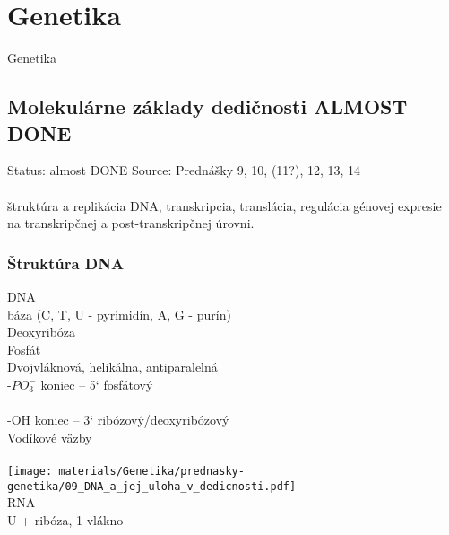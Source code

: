\chapter[Genetika]{Genetika}
\label{genetika} %

Genetika

\section{Molekulárne základy dedičnosti ALMOST DONE}

Status: almost DONE
Source: Prednášky 9, 10, (11?), 12, 13, 14\\
\\
štruktúra a replikácia DNA, transkripcia, translácia, regulácia génovej expresie na transkripčnej a post-transkripčnej úrovni. \\
\subsection*{Štruktúra DNA}
DNA\\
\tab báza (C, T, U - pyrimidín, A, G - purín) \\
\tab Deoxyribóza\\
\tab Fosfát\\
\tab Dvojvláknová, helikálna, antiparalelná\\
\tab -$PO_3^-$ koniec -- 5` fosfátový\\\\
\tab -OH koniec -- 3` ribózový/deoxyribózový\\
\tab Vodíkové väzby\\
\\
\texttt{[image: materials/Genetika/prednasky-genetika/09\_DNA\_a\_jej\_uloha\_v\_dedicnosti.pdf]}
\\
RNA\\
\tab U + ribóza, 1 vlákno\\
\\
